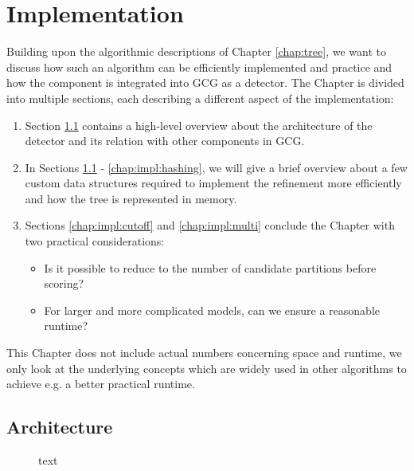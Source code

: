 \chapter{Implementation}
\label{chap:impl}

	Building upon the algorithmic descriptions of Chapter \ref{chap:tree}, we want to discuss how such an algorithm can be efficiently implemented and practice and how the component is integrated into \ac{GCG} as a detector.
	The Chapter is divided into multiple sections, each describing a different aspect of the implementation:
	
	\begin{enumerate}
		\item Section \ref{chap:impl:architecture} contains a high-level overview about the architecture of the detector and its relation with other components in \ac{GCG}.
		\item In Sections \ref{chap:impl:architecture} - \ref{chap:impl:hashing}, we will give a brief overview about a few custom data structures required to implement the refinement more efficiently and how the tree is represented in memory.
		\item Sections \ref{chap:impl:cutoff} and \ref{chap:impl:multi} conclude the Chapter with two practical considerations:
		\begin{itemize}
			\item Is it possible to reduce to the number of candidate partitions before scoring?
			\item For larger and more complicated models, can we ensure a reasonable runtime?
		\end{itemize}
	\end{enumerate}
	
	This Chapter does not include actual numbers concerning space and runtime, we only look at the underlying concepts which are widely used in other algorithms to achieve e.g. a better practical runtime.
	
	\clearpage

	\section{Architecture}
	\label{chap:impl:architecture}
	
		\begin{figure}[ht!]
			\centering
			
			\caption{text}
			\label{fig:impl:arch:overview}
		\end{figure}
		
